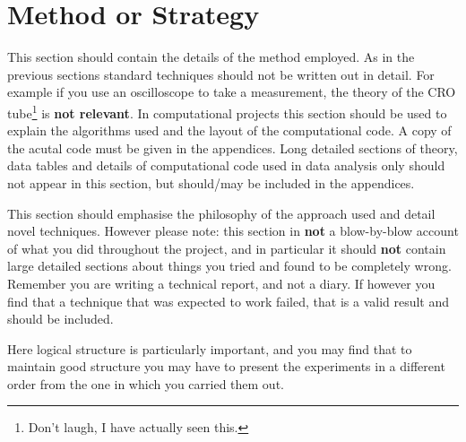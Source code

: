\section{Method or Strategy}

This section should contain the details of the method employed. 
As in the previous sections standard techniques should not be written
out in detail. For example if you use an oscilloscope to take a
measurement, the theory of the CRO tube\footnote{Don't laugh, I have actually
seen this.} is {\bf not relevant}. In computational projects this
section should be used to explain the algorithms used and the layout of
the computational code. A copy of the acutal code must be
given in the appendices. Long detailed sections of theory, data tables
and details of computational code used in data analysis only should not
appear in this section, but should/may be included in the appendices.

This section should emphasise the philosophy of the approach used
and detail novel techniques. However
please note: this section in {\bf not} a blow-by-blow account of what
you did throughout the project, and in particular it should {\bf not} 
contain large detailed sections about things you tried and found to be
completely wrong. Remember you are writing a technical report, and
not a diary. If however you find that a technique that was expected to
work failed, that is a valid result and should be included.

Here logical structure is particularly important, and you may find that
to maintain good structure you may have to present the experiments
in a different order from the one in which you carried them out.